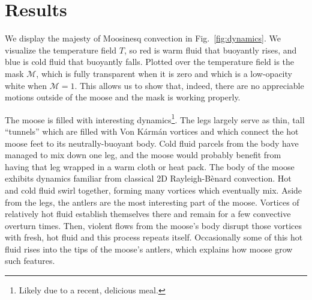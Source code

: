 \section{Results}
\label{sec:results}

We display the majesty of Moosinesq convection in Fig.~\ref{fig:dynamics}.
We visualize the temperature field $T$, so red is warm fluid that buoyantly rises, and blue is cold fluid that buoyantly falls.
Plotted over the temperature field is the mask $\mathcal{M}$, which is fully transparent when it is zero and which is a low-opacity white when $\mathcal{M} = 1$.
This allows us to show that, indeed, there are no appreciable motions outside of the moose and the mask is working properly.

The moose is filled with interesting dynamics\footnote{Likely due to a recent, delicious meal.}.
The legs largely serve as thin, tall ``tunnels'' which are filled with Von K\'{a}rm\'{a}n vortices and which connect the hot moose feet to its neutrally-buoyant body.
Cold fluid parcels from the body have managed to mix down one leg, and the moose would probably benefit from having that leg wrapped in a warm cloth or heat pack.
The body of the moose exhibits dynamics familiar from classical 2D Rayleigh-B\`{e}nard convection.
Hot and cold fluid swirl together, forming many vortices which eventually mix.
Aside from the legs, the antlers are the most interesting part of the moose.
Vortices of relatively hot fluid establish themselves there and remain for a few convective overturn times.
Then, violent flows from the moose's body disrupt those vortices with fresh, hot fluid and this process repeats itself.
Occasionally some of this hot fluid rises into the tips of the moose’s antlers, which explains how moose grow such features.

